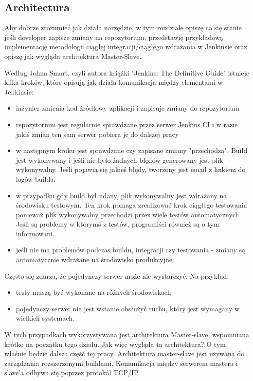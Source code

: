 \subsection{Architectura}

Aby dobrze zrozumieć jak działa narzędzie, w tym rozdziale opiszę co się stanie jeśli developer zapisze zmiany na repozytorium, przedstawię przykładową implementację metodologii ciągłej integracji/ciągłego wdrażania w Jenkinsie oraz opiszę jak wygląda architektura Master-Slave.

Według Johna Smart, czyli autora książki "Jenkins: The Definitive Guide" istnieje kilka kroków, które opisują jak działa komunikacja między elementami w Jenkinsie: 
\begin{itemize}
    \item inżynier zmienia kod źródłowy aplikacji i zapisuje zmiany do repozytorium
    \item repozytorium jest regularnie sprawdzane przez serwer Jenkins CI i w razie jakiś zmian ten sam serwer pobiera je do dalszej pracy
    \item w następnym kroku jest sprawdzane czy zapisane zmiany "przechodzą". Build  jest wykonywany i jeśli nie było żadnych błędów generowany jest plik wykonywalny. Jeśli pojawią się jakieś błędy, tworzony jest email z linkiem do logów builda. 
    \item w przypadku gdy build był udany, plik wykonywalny jest wdrażany na środowisku testowym. Ten krok pomaga zrealizować krok ciągłego testowania ponieważ plik wykonywalny przechodzi przez wiele testów automatycznych. Jeśli są problemy w którymś z testów, programiści również są o tym informowani.
    \item jeśli nie ma problemów podczas buildu, integracji czy testowania - zmiany są automatycznie wdrażane na środowisko produkcyjne
\end{itemize}



Często się zdarza, że pojedynczy serwer może nie wystarczyć. Na przykład:
\begin{itemize}
    \item testy muszą być wykonane na różnych środowiskach
    \item pojedynczy serwer nie jest wstanie obsłużyć ruchu, który jest wymagany w wielkich systemach.
\end{itemize}

W tych przypadkach wykorzystywana jest architektura Master-slave, wspomniana krótko na początku tego działu. Jak więc wygląda ta architektura? O tym właśnie będzie dalsza część tej pracy. 
Architektura master-slave jest używana do zarządzania rozszerzonymi buildami. Komunikacja między serwerem mastera i slave'a odbywa się poprzez protokół TCP/IP. 

